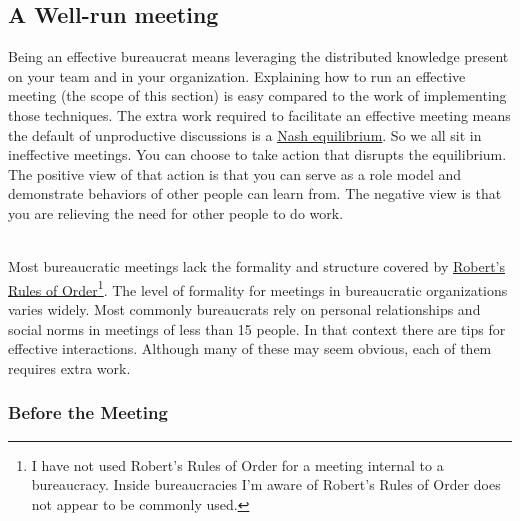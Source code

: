 \subsection*{A Well-run meeting\label{sec:well-run-meeting}}

Being an effective bureaucrat means leveraging the distributed knowledge present on your team and in your organization.
Explaining how to run an effective meeting (the scope of this section) is easy compared to the work of implementing those techniques. The extra work required to facilitate an effective meeting means the default of unproductive discussions is a \href{https://en.wikipedia.org/wiki/Nash_equilibrium}{Nash equilibrium}. 
\iftoggle{WPinmargin}{\marginpar{[Wikipedia] Nash \\ equilibrium}}{}
So we all sit in ineffective meetings. You can choose to take action that disrupts the equilibrium. The positive view of that action is that you can serve as a role model and demonstrate behaviors of other people can learn from. The negative view is that you are relieving the need for other people to do work.

\ \\

Most bureaucratic meetings lack the formality and structure  covered by \href{https://en.wikipedia.org/wiki/Robert\%27s_Rules_of_Order}{Robert's Rules of Order}\footnote{I have not used Robert's Rules of Order for a meeting internal to a bureaucracy. Inside bureaucracies I'm aware of Robert's Rules of Order does not appear to be commonly used.}. 
\iftoggle{WPinmargin}{\marginpar{[Wikipedia] Robert's \\Rules of Order}}{}
The level of formality for meetings in bureaucratic organizations varies widely. Most commonly bureaucrats rely on personal relationships and social norms in meetings of less than 15 people. In that context there are tips for effective interactions. Although many of these may seem obvious, each of them requires extra work. 


\subsubsection*{Before the Meeting}

